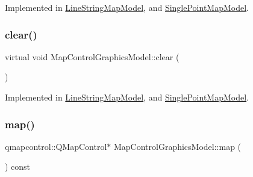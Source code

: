 Implemented in \mbox{\hyperlink{class_line_string_map_model_ac4dae650b1e13b3517f134de4b90a3cf}{Line\+String\+Map\+Model}}, and \mbox{\hyperlink{class_single_point_map_model_ade0986118e8cb4b9292c163d52ae6cb7}{Single\+Point\+Map\+Model}}.

\mbox{\label{class_map_control_graphics_model_a2cfbe94a0c1124d5af186a75245de1e2}} 
\subsubsection{\texorpdfstring{clear()}{clear()}}
{\footnotesize\ttfamily virtual void Map\+Control\+Graphics\+Model\+::clear (\begin{DoxyParamCaption}{ }\end{DoxyParamCaption})\hspace{0.3cm}{\ttfamily [pure virtual]}}



Implemented in \mbox{\hyperlink{class_line_string_map_model_a55ac4e44332434feaa70f15edfd1f925}{Line\+String\+Map\+Model}}, and \mbox{\hyperlink{class_single_point_map_model_ae6778b1f7ed46f20b670dda409938266}{Single\+Point\+Map\+Model}}.

\mbox{\label{class_map_control_graphics_model_ab2275e899196413e12f8146c407548c2}} 
\subsubsection{\texorpdfstring{map()}{map()}}
{\footnotesize\ttfamily qmapcontrol\+::\+Q\+Map\+Control$\ast$ Map\+Control\+Graphics\+Model\+::map (\begin{DoxyParamCaption}{ }\end{DoxyParamCaption}) const\hspace{0.3cm}{\ttfamily [inline]}}

\mbox{\label{class_map_control_graphics_model_a90e3c5e9966a507598f37e7a2a3ad509}} 
